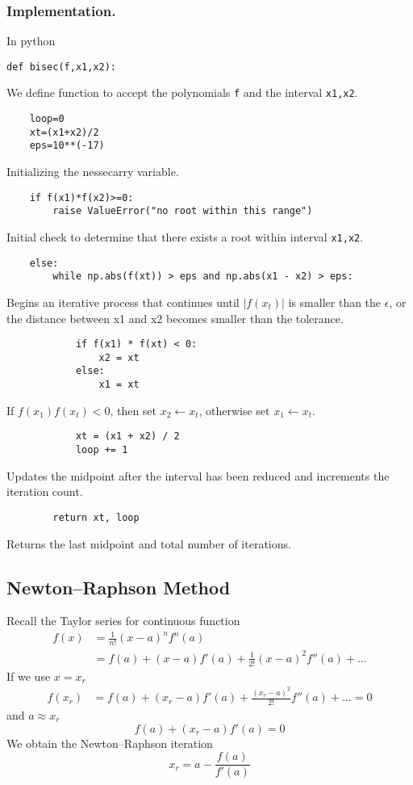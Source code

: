 \documentclass[../../../main.tex]{subfiles}
\begin{document}
\subsubsection{Implementation.}
In python
\begin{verbatim}
def bisec(f,x1,x2):
\end{verbatim}
We define function to accept the polynomials \verb|f| and the interval \verb|x1,x2|.
\begin{verbatim}
    loop=0
    xt=(x1+x2)/2
    eps=10**(-17)
\end{verbatim}
Initializing the nessecarry variable.
\begin{verbatim}
    if f(x1)*f(x2)>=0:
        raise ValueError("no root within this range")
\end{verbatim}
Initial check to determine that there exists a root within interval \verb|x1,x2|.
\begin{verbatim}
    else:
        while np.abs(f(xt)) > eps and np.abs(x1 - x2) > eps:
\end{verbatim}
Begins an iterative process that continues until $|f(x_t)|$ is smaller than the $\epsilon$, or the distance between x1 and x2 becomes smaller than the tolerance.
\begin{verbatim}
            if f(x1) * f(xt) < 0:
                x2 = xt
            else:
                x1 = xt
\end{verbatim}
If $f(x_1) f(x_t) < 0$, then set $x_2 \leftarrow x_t$, otherwise set $x_1 \leftarrow x_t$.
\begin{verbatim}
            xt = (x1 + x2) / 2
            loop += 1
\end{verbatim}
Updates the midpoint after the interval has been reduced and increments the iteration count.
\begin{verbatim}
        return xt, loop
\end{verbatim}
Returns the last midpoint and total number of iterations.

\subsection{Newton–Raphson Method}
Recall the Taylor series for continuous function
\begin{align*}
    f(x) & =         \frac{1}{n!}(x-a)^n f^{n}(a)              \\
         & =   f(a)+(x-a)f'(a)+\frac{1}{2!}(x-a)^2f''(a)+\dots
\end{align*}
If we use $x=x_r$
\begin{align*}
    f(x_r) & =  f(a)+(x_r-a)f'(a)+\frac{(x_r-a)^2}{2!}f''(a)+\dots=0
\end{align*}
and $a \approx x_r$
\begin{equation*}
    f(a)+(x_r-a)f'(a)=0
\end{equation*}
We obtain the Newton–Raphson iteration
\begin{equation*}
    x_r=a-\frac{f(a )}{f'(a)}
\end{equation*}
\end{document}
